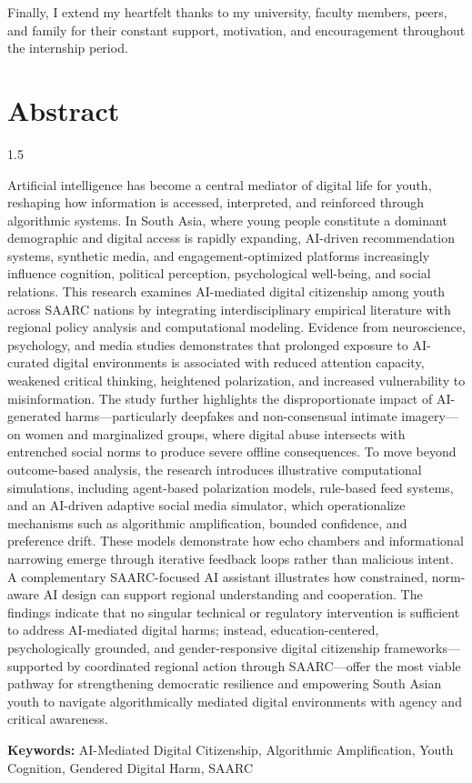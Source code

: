 \documentclass[12pt,a4paper]{report}
\begin{document}
Finally, I extend my heartfelt thanks to my university, faculty members, peers, and family for their constant support, motivation, and encouragement throughout the internship period.

\newpage

\chapter*{Abstract}
\begin{spacing}{1.5} %

Artificial intelligence has become a central mediator of digital life for youth, reshaping how information is accessed, interpreted, and reinforced through algorithmic systems. In South Asia, where young people constitute a dominant demographic and digital access is rapidly expanding, AI-driven recommendation systems, synthetic media, and engagement-optimized platforms increasingly influence cognition, political perception, psychological well-being, and social relations. This research examines AI-mediated digital citizenship among youth across SAARC nations by integrating interdisciplinary empirical literature with regional policy analysis and computational modeling. Evidence from neuroscience, psychology, and media studies demonstrates that prolonged exposure to AI-curated digital environments is associated with reduced attention capacity, weakened critical thinking, heightened polarization, and increased vulnerability to misinformation. The study further highlights the disproportionate impact of AI-generated harms—particularly deepfakes and non-consensual intimate imagery—on women and marginalized groups, where digital abuse intersects with entrenched social norms to produce severe offline consequences. To move beyond outcome-based analysis, the research introduces illustrative computational simulations, including agent-based polarization models, rule-based feed systems, and an AI-driven adaptive social media simulator, which operationalize mechanisms such as algorithmic amplification, bounded confidence, and preference drift. These models demonstrate how echo chambers and informational narrowing emerge through iterative feedback loops rather than malicious intent. A complementary SAARC-focused AI assistant illustrates how constrained, norm-aware AI design can support regional understanding and cooperation. The findings indicate that no singular technical or regulatory intervention is sufficient to address AI-mediated digital harms; instead, education-centered, psychologically grounded, and gender-responsive digital citizenship frameworks—supported by coordinated regional action through SAARC—offer the most viable pathway for strengthening democratic resilience and empowering South Asian youth to navigate algorithmically mediated digital environments with agency and critical awareness.
\end{spacing}
\medskip
\noindent
\textbf{Keywords:} AI-Mediated Digital Citizenship, Algorithmic Amplification, Youth Cognition, Gendered Digital Harm, SAARC
\end{document}

